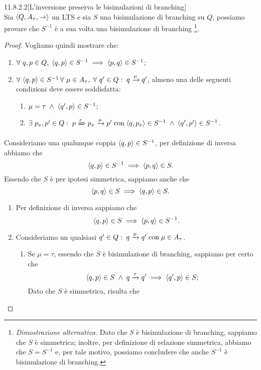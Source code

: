 \begin{customlemma}{11.8.2.2}[L'inversione preserva le bisimulazioni di branching]
\label{lemma:11.8.2.2} \hfill \\
Sia $\langle Q, A_{\tau}, \rightarrow \rangle$ un LTS e sia $S$ una bisimulazione di branching su $Q$, possiamo provare che $S^{-1}$ è a sua volta una bisimulazione di branching \footnote{\textit{Dimostrazione alternativa.} Dato che $S$ è bisimulazione di branching, sappiamo che $S$ è simmetrica; inoltre, per definizione di relazione simmetrica, abbiamo che $S=S^{-1}$ e, per tale motivo, possiamo concludere che anche $S^{-1}$ è bisimulazione di branching.}. 
\end{customlemma}
\begin{proof}
Vogliamo quindi mostrare che:
\begin{enumerate}
\item $\forall\ q,p \in Q ,\; \langle q,p \rangle \in S^{-1} 
\implies \langle p,q \rangle \in S^{-1}$;
\item $\forall\ \langle q,p \rangle \in S^{-1}\, \forall\ \mu \in A_{\tau} ,\;
\forall\ q' \in Q :\; q \xrightarrow{\mu} q'$, almeno una delle seguenti condizioni deve essere soddisfatta:
\begin{enumerate}
\item $\mu = \tau \; \land \; \langle q', p \rangle \in S^{-1}$;
\item $\exists\ p_x, p' \in Q :\; p \xRightarrow{\varepsilon} p_x \xrightarrow{\mu} p' 
	\; \text{con} \; \langle q, p_x \rangle \in S^{-1} 
	\; \land \; \langle q', p' \rangle \in S^{-1}$.
\end{enumerate}
\end{enumerate}
Consideriamo una qualunque coppia $\langle q,p \rangle \in S^{-1}$, per definizione di inversa abbiamo che \[
	\langle q,p \rangle \in S^{-1} \implies \langle p,q \rangle \in S.
\]
Essendo che $S$ è per ipotesi simmetrica, sappiamo anche che
\[
	\langle p,q \rangle \in S \implies \langle q,p \rangle \in S.
\]
\begin{enumerate}[leftmargin=*]
\item Per definizione di inversa sappiamo che
\[
	\langle q,p \rangle \in S \implies \langle p,q \rangle  \in S^{-1}.
\]
\item Consideriamo un qualsiasi $q' \in Q :\; q \xrightarrow{\mu} q' \; \text{con} \; \mu \in A_{\tau}$.
\begin{enumerate}
\item Se $\mu = \tau$, essendo che $S$ è bisimulazione di branching, sappiamo per certo che \[
	\langle q,p \rangle \in S \; \land \; q \xrightarrow{\tau} q'
	\implies \langle q',p \rangle \in S;
\]
Dato che $S$ è simmetrica, risulta che \[
\]
\end{enumerate}
\end{enumerate}
\end{proof}
